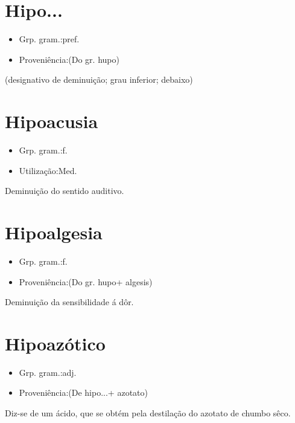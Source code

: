 \documentclass{article}
\begin{document}
\section{Hipo...}
\begin{itemize}
\item {Grp. gram.:pref.}
\end{itemize}
\begin{itemize}
\item {Proveniência:(Do gr. \textunderscore hupo\textunderscore )}
\end{itemize}
(designativo de \textunderscore deminuição\textunderscore ; \textunderscore grau inferior\textunderscore ; \textunderscore debaixo\textunderscore )
\section{Hipoacusia}
\begin{itemize}
\item {Grp. gram.:f.}
\end{itemize}
\begin{itemize}
\item {Utilização:Med.}
\end{itemize}
Deminuição do sentido auditivo.
\section{Hipoalgesia}
\begin{itemize}
\item {Grp. gram.:f.}
\end{itemize}
\begin{itemize}
\item {Proveniência:(Do gr. \textunderscore hupo\textunderscore  + \textunderscore algesis\textunderscore )}
\end{itemize}
Deminuição da sensibilidade á dôr.
\section{Hipoazótico}
\begin{itemize}
\item {Grp. gram.:adj.}
\end{itemize}
\begin{itemize}
\item {Proveniência:(De \textunderscore hipo...\textunderscore  + \textunderscore azotato\textunderscore )}
\end{itemize}
Diz-se de um ácido, que se obtém pela destilação do azotato de chumbo sêco.
\end{document}
